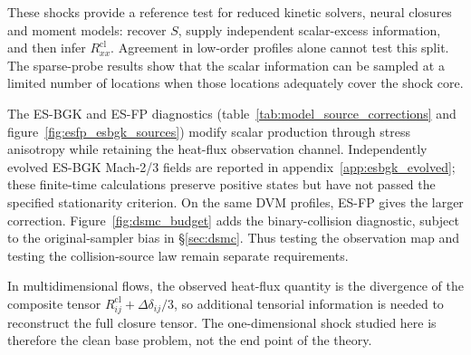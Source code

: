 \documentclass[lineno,paper]{JFM-FLM_Au}
\newenvironment{revision}{\nolinenumbers\begin{tcolorbox}[breakable,colback=revisionyellow,colframe=revisionyellow,boxrule=0pt,arc=0pt,left=5pt,right=5pt,top=5pt,bottom=5pt,before skip=6pt,after skip=6pt]\captionsetup{width=\linewidth}}{\end{tcolorbox}\linenumbers}
\newenvironment{revision}{}{}
\newcommand{\cl}{\mathrm{cl}}
\begin{document}
\begin{revision}
These shocks provide a reference test for reduced kinetic solvers, neural closures and moment models: recover $S$, supply independent scalar-excess information, and then infer $R^{\cl}_{xx}$. Agreement in low-order profiles alone cannot test this split. The sparse-probe results show that the scalar information can be sampled at a limited number of locations when those locations adequately cover the shock core.
\end{revision}

\begin{revision}
The ES-BGK and ES-FP diagnostics (table~\ref{tab:model_source_corrections} and figure~\ref{fig:esfp_esbgk_sources}) modify scalar production through stress anisotropy while retaining the heat-flux observation channel. Independently evolved ES-BGK Mach-2/3 fields are reported in appendix~\ref{app:esbgk_evolved}; these finite-time calculations preserve positive states but have not passed the specified stationarity criterion. On the same DVM profiles, ES-FP gives the larger correction. Figure~\ref{fig:dsmc_budget} adds the binary-collision diagnostic, subject to the original-sampler bias in \S\ref{sec:dsmc}. Thus testing the observation map and testing the collision-source law remain separate requirements.
\end{revision}

\begin{revision}
In multidimensional flows, the observed heat-flux quantity is the divergence of the composite tensor $R^{\cl}_{ij}+\Delta\delta_{ij}/3$, so additional tensorial information is needed to reconstruct the full closure tensor.  The one-dimensional shock studied here is therefore the clean base problem, not the end point of the theory.
\end{revision}
\end{document}
